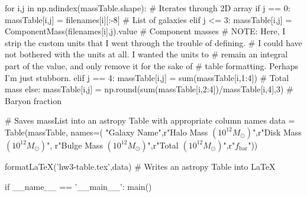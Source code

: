     for i,j in np.ndindex(massTable.shape): # Iterates through 2D array
        if j == 0:
            massTable[i,j] = filenames[i][:-8] # List of galaxies
        elif j <= 3:
            massTable[i,j] = ComponentMass(filenames[i],j).value # Component masses
            # NOTE: Here, I strip the custom units that I went through the trouble of defining.
            #       I could have not bothered with the units at all. I wanted the units to
            #       remain an integral part of the value, and only remove it for the sake of
            #       table formatting. Perhaps I'm just stubborn.
        elif j == 4:
            massTable[i,j] = sum(massTable[i,1:4]) # Total mass
        else:
            massTable[i,j] = np.round(sum(massTable[i,2:4])/massTable[i,4],3) # Baryon fraction

    # Saves massList into an astropy Table with appropriate column names
    data = Table(massTable, names=(
        "Galaxy Name",r"Halo Mass $(10^{12}M_\odot)$",r"Disk Mass $(10^{12}M_\odot)$",
        r"Bulge Mass $(10^{12}M_\odot)$",r"Total $(10^{12}M_\odot)$",r"$f_\text{bar}$"))

    formatLaTeX('hw3-table.tex',data) # Writes an astropy Table into LaTeX

if __name__ == '__main__':
    main()
